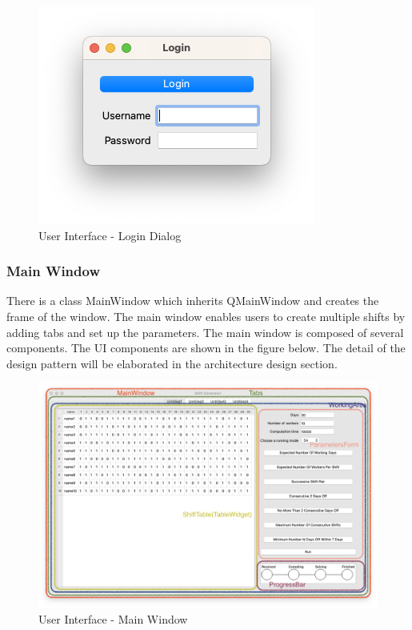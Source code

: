 \documentclass[11pt, oneside]{article}   	%
\begin{document}
\begin{figure}[h]
\centering
\includegraphics[scale=0.45]{login_window}
\caption{User Interface - Login Dialog}
\label{uilogin}
\end{figure}

\subsubsection{Main Window}
There is a class MainWindow which inherits QMainWindow and creates the frame of the window. The main window enables users to create multiple shifts by adding tabs and set up the parameters. The main window is composed of several components. The UI components are shown in the figure below. The detail of the design pattern will be elaborated in the architecture design section.
\begin{figure}[h]
\centering
\includegraphics[width=\textwidth]{main_window}
\caption{User Interface - Main Window}
\label{uimainwindow}
\end{figure}
\end{document}
